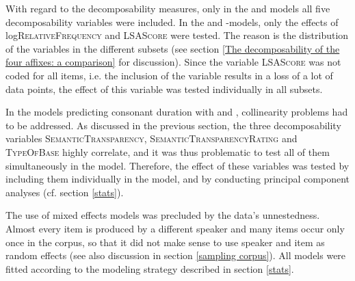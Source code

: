 With regard to the decomposability measures, only in the  and models all five decomposability variables were included. In the  and -models, only the effects of log\textsc{RelativeFrequency} and \textsc{LSAScore} were tested. The reason is the distribution of the variables in the different subsets (see section \ref {The decomposability of the four affixes: a comparison} for discussion). 
Since the variable \textsc{LSAScore} was not coded for all items, i.e. the inclusion of the variable results in a loss of a lot of data points, the effect of this variable was tested individually in all subsets. 

In the models predicting consonant duration with  and , collinearity problems had to be addressed. As discussed in the previous section, the three decomposability variables \textsc{SemanticTransparency}, \textsc{SemanticTransparencyRating} and \textsc{TypeOfBase} highly correlate, and it was thus problematic to test all of them simultaneously in the model. Therefore, the effect of these variables was tested by including them individually in the model, and by conducting principal component analyses (cf. section \ref{stats}). 


The use of mixed effects models was precluded by the data's unnestedness. Almost every item is produced by a different speaker and many items occur only once in the corpus, so that it did not make sense to use speaker and item as random effects (see also discussion in section \ref{sampling corpus}). All models were fitted according to the modeling strategy described in section \ref{stats}.



